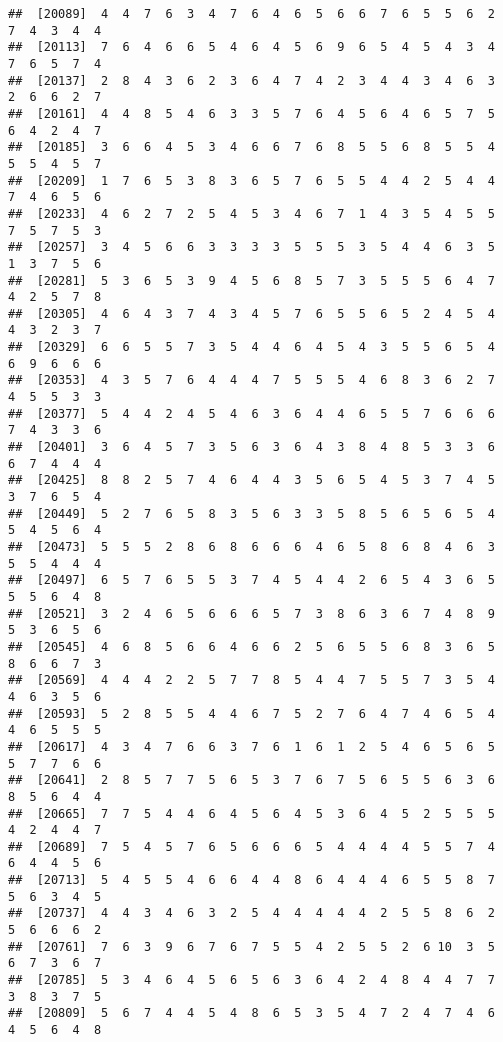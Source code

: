 \documentclass[
]{book}
\begin{document}
\begin{verbatim}
##  [20089]  4  4  7  6  3  4  7  6  4  6  5  6  6  7  6  5  5  6  2  7  4  3  4  4
##  [20113]  7  6  4  6  6  5  4  6  4  5  6  9  6  5  4  5  4  3  4  7  6  5  7  4
##  [20137]  2  8  4  3  6  2  3  6  4  7  4  2  3  4  4  3  4  6  3  2  6  6  2  7
##  [20161]  4  4  8  5  4  6  3  3  5  7  6  4  5  6  4  6  5  7  5  6  4  2  4  7
##  [20185]  3  6  6  4  5  3  4  6  6  7  6  8  5  5  6  8  5  5  4  5  5  4  5  7
##  [20209]  1  7  6  5  3  8  3  6  5  7  6  5  5  4  4  2  5  4  4  7  4  6  5  6
##  [20233]  4  6  2  7  2  5  4  5  3  4  6  7  1  4  3  5  4  5  5  7  5  7  5  3
##  [20257]  3  4  5  6  6  3  3  3  3  5  5  5  3  5  4  4  6  3  5  1  3  7  5  6
##  [20281]  5  3  6  5  3  9  4  5  6  8  5  7  3  5  5  5  6  4  7  4  2  5  7  8
##  [20305]  4  6  4  3  7  4  3  4  5  7  6  5  5  6  5  2  4  5  4  4  3  2  3  7
##  [20329]  6  6  5  5  7  3  5  4  4  6  4  5  4  3  5  5  6  5  4  6  9  6  6  6
##  [20353]  4  3  5  7  6  4  4  4  7  5  5  5  4  6  8  3  6  2  7  4  5  5  3  3
##  [20377]  5  4  4  2  4  5  4  6  3  6  4  4  6  5  5  7  6  6  6  7  4  3  3  6
##  [20401]  3  6  4  5  7  3  5  6  3  6  4  3  8  4  8  5  3  3  6  6  7  4  4  4
##  [20425]  8  8  2  5  7  4  6  4  4  3  5  6  5  4  5  3  7  4  5  3  7  6  5  4
##  [20449]  5  2  7  6  5  8  3  5  6  3  3  5  8  5  6  5  6  5  4  5  4  5  6  4
##  [20473]  5  5  5  2  8  6  8  6  6  6  4  6  5  8  6  8  4  6  3  5  5  4  4  4
##  [20497]  6  5  7  6  5  5  3  7  4  5  4  4  2  6  5  4  3  6  5  5  5  6  4  8
##  [20521]  3  2  4  6  5  6  6  6  5  7  3  8  6  3  6  7  4  8  9  5  3  6  5  6
##  [20545]  4  6  8  5  6  6  4  6  6  2  5  6  5  5  6  8  3  6  5  8  6  6  7  3
##  [20569]  4  4  4  2  2  5  7  7  8  5  4  4  7  5  5  7  3  5  4  4  6  3  5  6
##  [20593]  5  2  8  5  5  4  4  6  7  5  2  7  6  4  7  4  6  5  4  4  6  5  5  5
##  [20617]  4  3  4  7  6  6  3  7  6  1  6  1  2  5  4  6  5  6  5  5  7  7  6  6
##  [20641]  2  8  5  7  7  5  6  5  3  7  6  7  5  6  5  5  6  3  6  8  5  6  4  4
##  [20665]  7  7  5  4  4  6  4  5  6  4  5  3  6  4  5  2  5  5  5  4  2  4  4  7
##  [20689]  7  5  4  5  7  6  5  6  6  6  5  4  4  4  4  5  5  7  4  6  4  4  5  6
##  [20713]  5  4  5  5  4  6  6  4  4  8  6  4  4  4  6  5  5  8  7  5  6  3  4  5
##  [20737]  4  4  3  4  6  3  2  5  4  4  4  4  4  2  5  5  8  6  2  5  6  6  6  2
##  [20761]  7  6  3  9  6  7  6  7  5  5  4  2  5  5  2  6 10  3  5  6  7  3  6  7
##  [20785]  5  3  4  6  4  5  6  5  6  3  6  4  2  4  8  4  4  7  7  3  8  3  7  5
##  [20809]  5  6  7  4  4  5  4  8  6  5  3  5  4  7  2  4  7  4  6  4  5  6  4  8

\end{verbatim}
\end{document}
